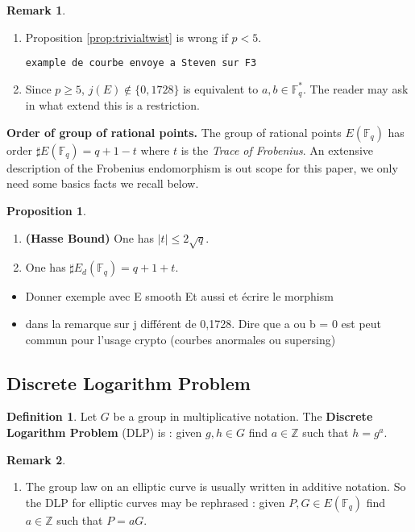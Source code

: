 \documentclass[10pt]{article}
\theoremstyle{definition}
\newtheorem{definition}{Definition}
\newtheorem{proposition}{Proposition}
\newtheorem{remark}{Remark}
\newcommand{\F}{\mathbb{F}}
\newcommand{\Z}{\mathbb{Z}}
\begin{document}
\noindent \begin{remark}
\begin{enumerate}
\item Proposition \ref{prop:trivialtwist} is wrong if $p < 5$.
\begin{verbatim}
example de courbe envoye a Steven sur F3
\end{verbatim}
\item Since $p \geq 5$, $j(E) \notin \lbrace 0, 1728 \rbrace $ is equivalent to $a,b \in \F_q^{*}$.
The reader may ask in what extend this is a restriction.
\end{enumerate}
\end{remark}

\noindent \textbf{Order of group of rational points.} The group of rational points $E(\F_q)$ has order $\sharp E(\F_q) = q + 1 -t$ where $t$ is the \textsl{Trace of Frobenius}.
An extensive description of the Frobenius endomorphism is out scope for this paper, we only need some basics facts we recall below.

\begin{proposition}
\begin{enumerate}
\item \textbf{(Hasse Bound)} One has $|t|  \leq 2 \sqrt{q}$.
\item One has $\sharp E_d(\F_q) = q+1+t$.
\end{enumerate}
\end{proposition}

\vspace*{.5cm}
\begin{itemize}
\item Donner exemple avec E smooth Et aussi et écrire le morphism
\item dans la remarque sur j différent de 0,1728. Dire que a ou b = 0 est peut commun pour l'usage crypto (courbes anormales ou supersing)
\end{itemize}

\subsection{Discrete Logarithm Problem}

\begin{definition}
Let $G$ be a group in multiplicative notation.
The \textbf{Discrete Logarithm Problem} (DLP) is : given $g,h \in G$ find $a \in \Z$ such that $h = g^a$.
\end{definition}

\noindent \begin{remark}
\begin{enumerate}
\item The group law on an elliptic curve is usually written in additive notation.
So the DLP for elliptic curves may be rephrased : given $P,G \in E(\F_q)$ find $a \in \Z$ such that $P = aG$.
\end{enumerate}
\end{remark}
\end{document}
